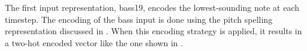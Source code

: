 
The first input representation, \gls{bass19}, encodes the
lowest-sounding note at each timestep. The encoding of the
bass input is done using the pitch spelling representation
discussed in . When this
encoding strategy is applied, it results in a two-hot
encoded vector like the one shown in .


